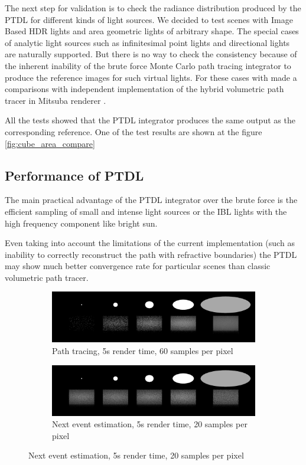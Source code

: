 The next step for validation is to check the radiance distribution produced by the PTDL for
different kinds of light sources. We decided to test scenes with Image Based HDR lights and area
geometric lights of arbitrary shape. The special cases of analytic light sources such
as infinitesimal point lights and directional lights are naturally supported. But there is no way to
check the consistency because of the inherent inability of the brute force Monte Carlo path tracing
integrator to produce the reference images for such virtual lights. For these cases with made a
comparisons with independent implementation of the hybrid volumetric path tracer in Mitsuba renderer
\cite{Mitsuba}.

All the tests showed that the PTDL integrator produces the same output as the corresponding
reference. One of the test results are shown at the figure \ref{fig:cube_area_compare}

\subsection{Performance of PTDL}
The main practical advantage of the PTDL integrator over the brute force is the efficient sampling
of small and intense light sources or the IBL lights with the high frequency component like bright
sun.

Even taking into account the limitations of the current implementation (such as inability to
correctly reconstruct the path with refractive boundaries) the PTDL may show much better convergence
rate for particular scenes than classic volumetric path tracer.

\begin{figure}[h]
    \centering
    \begin{subfigure}{\textwidth}
        \includegraphics[width=\textwidth]{imgs/renders/spheres_path}
        \caption{Path tracing, 5s render time, 60 samples per pixel}
        \label{fig:spheres_path}
    \end{subfigure}
    \begin{subfigure}{\textwidth}
        \includegraphics[width=\textwidth]{imgs/renders/spheres_ptdl}
        \caption{Next event estimation, 5s render time, 20 samples per pixel}
        \label{fig:spheres_ptdl}
    \end{subfigure}
\end{figure}

